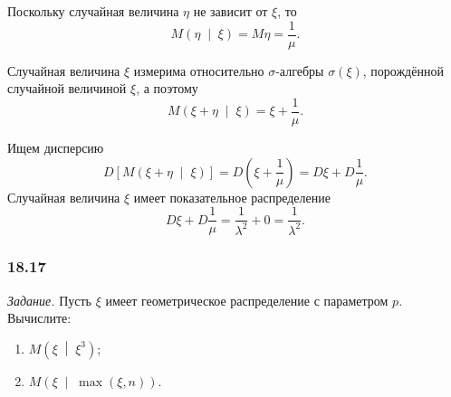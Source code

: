 Поскольку случайная величина $ \eta $ не зависит от $ \xi $, то
$$M \left( \eta \; \middle| \; \xi \right) =
  M \eta =
  \frac{1}{ \mu }.$$

Случайная величина $ \xi $ измерима относительно $ \sigma $-алгебры $ \sigma \left( \xi \right) $,
порождённой случайной величиной $ \xi $, а поэтому
$$M \left( \xi + \eta \; \middle| \; \xi \right) =
  \xi + \frac{1}{ \mu }.$$

Ищем дисперсию
$$D \left[ M \left( \xi + \eta \; \middle| \; \xi \right) \right] =
  D \left( \xi + \frac{1}{ \mu } \right) =
  D \xi + D \frac{1}{ \mu }.$$
Случайная величина $ \xi $ имеет показательное распределение
$$D \xi + D \frac{1}{ \mu } =
  \frac{1}{ \lambda^2} + 0 =
  \frac{1}{ \lambda^2}.$$

\subsubsection*{18.17}

\textit{Задание.} Пусть $ \xi $ имеет геометрическое распределение с параметром $p$.
Вычислите:
\begin{enumerate}[label=\alph*)]
  \item $M \left( \xi \; \middle| \; \xi^3 \right) $;
  \item $M \left( \xi \; \middle| \; \max \left( \xi, n \right) \right) $.
\end{enumerate}

